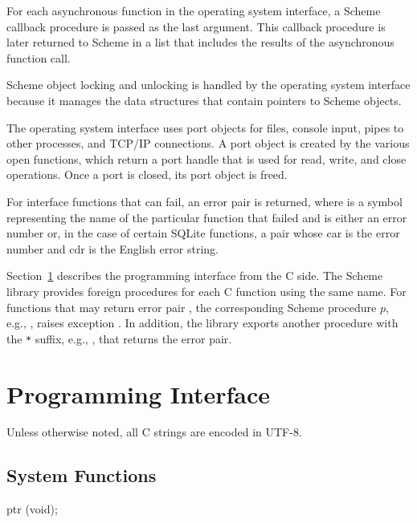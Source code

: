 For each asynchronous function in the operating system interface, a
Scheme callback procedure is passed as the last argument.  This
callback procedure is later returned to Scheme in a list that includes
the results of the asynchronous function call.

Scheme object locking and unlocking is handled by the operating system
interface because it manages the data structures that contain pointers
to Scheme objects.

The operating system interface uses port objects for files, console
input, pipes to other processes, and TCP/IP connections. A port object
is created by the various open functions, which return a port handle
that is used for read, write, and close operations. Once a port is
closed, its port object is freed.

For interface functions that can fail, an error pair
 is returned, where  is a
symbol representing the name of the particular function that failed
and  is either an error number or, in the case of certain
SQLite functions, a pair whose car is the error number and cdr is the
English error string.

Section~\ref{sec:osi-api} describes the programming interface from the
C side. The Scheme library  provides foreign procedures
for each C function using the same name. For functions that may return
error pair , the corresponding Scheme
procedure $p$, e.g., , raises exception
. In addition, the
 library exports another procedure with the \verb|*|
suffix, e.g., , that returns the error pair.

\section {Programming Interface}\label{sec:osi-api}

Unless otherwise noted, all C strings are encoded in UTF-8.

\subsection {System Functions}

\begin{function}
  ptr (void);
\end{function}

